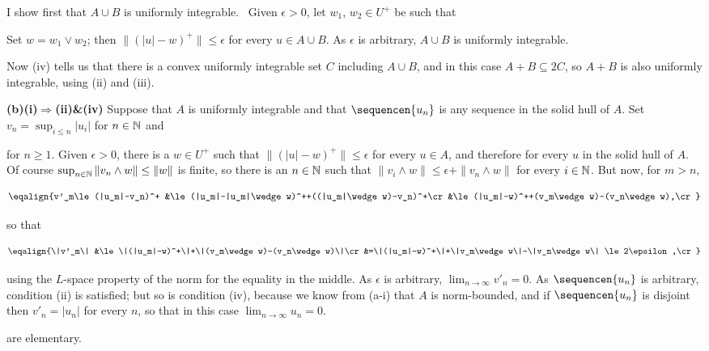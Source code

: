 {\medskip

 I show first that $A\cup B$ is uniformly integrable.
\Prf\ Given $\epsilon>0$, let $w_1$, $w_2\in U^+$ be such that


\noindent Set $w=w_1\vee w_2$;  then
$\|(|u|-w)^+\|\le\epsilon$ for every $u\in A\cup B$.   As $\epsilon$ is
arbitrary, $A\cup B$ is uniformly integrable.\ \Qed

Now (iv) tells us that there is a convex uniformly integrable set $C$
including $A\cup B$, and in this case $A+B\subseteq 2C$, so $A+B$ is
also uniformly integrable, using (ii) and (iii).

\medskip

{\bf (b)(i)$\Rightarrow$(ii)\&(iv)} Suppose that $A$ is uniformly
integrable and that $\sequencen{u_n}$ is any sequence in the solid hull
of $A$.   Set $v_n=\sup_{i\le n}|u_i|$ for $n\in\Bbb N$ and


\noindent for $n\ge 1$.   Given $\epsilon>0$, there is a $w\in U^+$ such
that $\|(|u|-w)^+\|\le\epsilon$ for every $u\in A$, and therefore for
every $u$ in the solid hull of $A$.   Of course
$\sup_{n\in\Bbb N}\|v_n\wedge w\|\le\|w\|$ is finite, so there is an
$n\in\Bbb N$ such
that $\|v_i\wedge w\|\le\epsilon+\|v_n\wedge w\|$ for every
$i\in\Bbb N$.   But now, for $m>n$,

$$\eqalign{v'_m\le(|u_m|-v_n)^+
&\le(|u_m|-|u_m|\wedge w)^++((|u_m|\wedge w)-v_n)^+\cr
&\le(|u_m|-w)^++(v_m\wedge w)-(v_n\wedge w),\cr}$$

\noindent so that

$$\eqalign{\|v'_m\|
&\le\|(|u_m|-w)^+\|+\|(v_m\wedge w)-(v_n\wedge w)\|\cr
&=\|(|u_m|-w)^+\|+\|v_m\wedge w\|-\|v_n\wedge w\|
\le 2\epsilon,\cr}$$

\noindent using the $L$-space property of the norm for the equality in
the middle.   As $\epsilon$ is arbitrary, $\lim_{n\to\infty}v'_n=0$.
As $\sequencen{u_n}$ is arbitrary, condition (ii) is satisfied;  but so
is condition (iv), because we know from (a-i) that $A$ is norm-bounded,
and if $\sequencen{u_n}$ is disjoint then $v'_n=|u_n|$ for every $n$, so
that in this case $\lim_{n\to\infty}u_n=0$.

\medskip

 are elementary.

}
